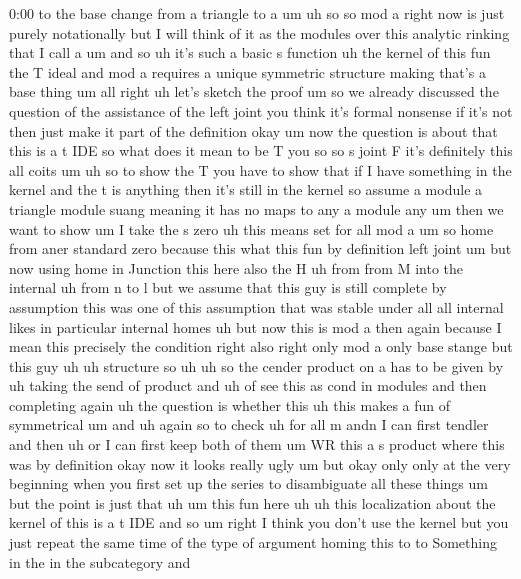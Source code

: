 \begin{unfinished}{0:00}
to  the  base  change  from  a  triangle  to
a
um
uh  so  so  mod  a  right  now  is  just  purely
notationally  but  I  will  think  of  it  as
the  modules  over  this  analytic  rinking
that  I  call  a  um  and  so  uh  it's  such  a
basic  s  function
uh  the
kernel  of  this  fun  the  T
ideal
and  mod  a
requires  a  unique  symmetric
structure
making  that's  a  base
thing
um  all  right  uh  let's  sketch  the  proof
um  so  we  already  discussed  the  question
of  the  assistance  of  the  left  joint  you
think  it's  formal  nonsense  if  it's  not
then  just  make  it  part  of  the  definition
okay  um  now  the  question  is  about  that
this  is  a  t  IDE  so  what  does  it  mean  to
be  T  you  so  so  s  joint  F  it's  definitely
this  all
coits
um  uh  so  to  show  the  T  you  have  to  show
that  if  I  have  something  in  the  kernel
and  the  t  is  anything  then  it's  still  in
the  kernel  so
assume  a  module  a  triangle  module
suang  meaning  it  has  no  maps  to  any  a
module
any  um  then  we  want  to
show  um  I
take  the  s
zero  uh  this  means  set  for
all  mod
a
um  so
home  from
aner
standard  zero  because  this  what  this  fun
by  definition  left  joint  um  but  now
using  home  in  Junction  this  here  also
the
H
uh
from  from
M  into  the
internal  uh  from  n  to  l
but  we  assume
that  this  guy  is  still  complete  by
assumption  this  was  one  of  this
assumption  that  was  stable  under  all  all
internal  likes  in  particular  internal
homes
uh  but  now  this  is  mod  a  then  again
because  I  mean  this  precisely  the
condition  right  also
right  only  mod
a  only  base
stange  but  this
guy
uh
uh  structure  so
uh  uh  so  the  cender  product  on
a  has  to
be  given
by  uh  taking  the  send  of
product  and
uh  of  see  this  as  cond  in  modules  and
then  completing
again  uh  the  question  is  whether  this
uh  this  makes  a  fun  of  symmetrical  um
and  uh  again  so  to
check  uh  for  all  m
andn
I
can  first
tendler  and
then  uh  or  I  can
first  keep  both  of
them
um  WR  this  a  s  product  where  this  was  by
definition  okay  now  it  looks  really  ugly
um  but  okay  only  only  at  the  very
beginning  when  you  first  set  up  the
series  to
disambiguate  all  these
things
um  but  the  point  is  just  that
uh
um  this  fun  here  uh  uh  this  localization
about
the  kernel  of  this  is  a  t  IDE  and
so
um
right  I  think  you  don't  use  the  kernel
but  you  just  repeat  the  same  time  of  the
type  of  argument  homing  this  to  to
Something  in  the  in  the  subcategory  and

\end{unfinished}
